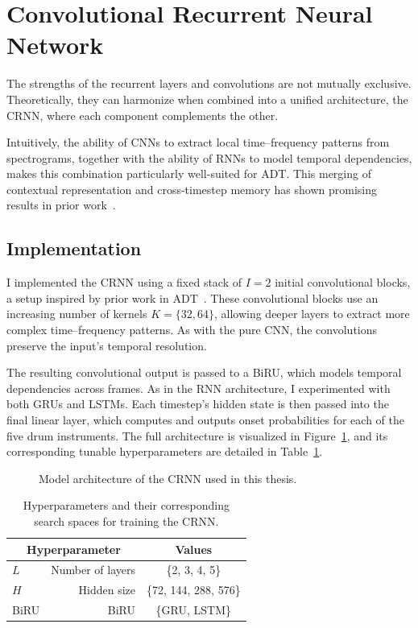 \section[Convolutional RNN]{Convolutional Recurrent Neural Network}

The strengths of the recurrent layers and convolutions are not mutually exclusive. Theoretically, they can harmonize when combined into a unified architecture, the \gls{CRNN}, where each component complements the other.

Intuitively, the ability of \glspl{CNN} to extract local time–frequency patterns from spectrograms, together with the ability of \glspl{RNN} to model temporal dependencies, makes this combination particularly well-suited for \gls{ADT}. This merging of contextual representation and cross-timestep memory has shown promising results in prior work~\cite{Vogl2017DrumTV, vogl2018multiinstrumentdrumtranscription, signals4040042}.

\subsection{Implementation}

I implemented the \gls{CRNN} using a fixed stack of $I = 2$ initial convolutional blocks, a setup inspired by prior work in \gls{ADT}~\cite{Vogl2017DrumTV, signals4040042}. These convolutional blocks use an increasing number of kernels $K = \{32, 64\}$, allowing deeper layers to extract more complex time–frequency patterns. As with the pure \gls{CNN}, the convolutions preserve the input's temporal resolution.

The resulting convolutional output is passed to a \gls{BiRU}, which models temporal dependencies across frames. As in the \gls{RNN} architecture, I experimented with both \glspl{GRU} and \glspl{LSTM}. Each timestep's hidden state is then passed into the final linear layer, which computes and outputs onset probabilities for each of the five drum instruments. The full architecture is visualized in Figure~\ref{CRNNFigure}, and its corresponding tunable hyperparameters are detailed in Table~\ref{CRNNHyperparams}.

\begin{figure}[H]
    \centering
    
    \caption{Model architecture of the \acrlong{CRNN} used in this thesis.}
    \label{CRNNFigure}
\end{figure}

\begin{table}[H]
    \centering
    \begin{tabular}{lr|c}
        \multicolumn{2}{c|}{Hyperparameter} & Values       \\
        \hline
        $L$ & Number of layers      & \{2, 3, 4, 5\} \\
        $H$ & Hidden size      & \{72, 144, 288, 576\} \\
        \gls{BiRU} & \acrlong{BiRU} & \{\gls{GRU}, \gls{LSTM}\}\\
    \end{tabular}
    \caption{Hyperparameters and their corresponding search spaces for training the \acrlong{CRNN}.}
    \label{CRNNHyperparams}
\end{table}

